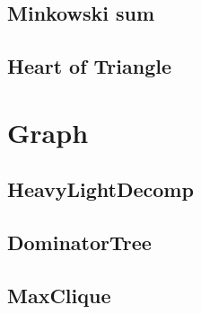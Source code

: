 \documentclass[a4paper,10pt,twocolumn,oneside]{article}
\begin{document}
%

\subsection{Minkowski sum}


% 

%

%

\subsection{Heart of Triangle}


\section{Graph}
\subsection{HeavyLightDecomp}


\subsection{DominatorTree}


\subsection{MaxClique}
% 

\end{document}
